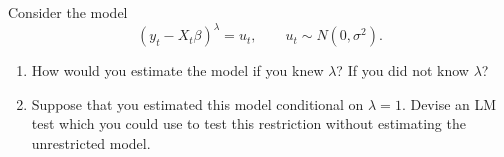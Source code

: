 \documentclass[11pt]{article}
\begin{document}
Consider the model
\[
  (y_t-X_t\beta)^{\lambda}=u_t,
  \qquad u_t\sim N(0,\sigma^2).
\]
\begin{enumerate}[label=(\roman*),leftmargin=2em,itemsep=6pt,topsep=4pt]
\item How would you estimate the model if you knew $\lambda$? If you did
not know $\lambda$?
\item Suppose that you estimated this model conditional on $\lambda=1$.
Devise an LM test which you could use to test this restriction without
estimating the unrestricted model.
\end{enumerate}
\end{document}
